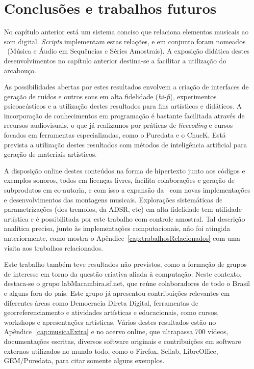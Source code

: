 \chapter{Conclusões e trabalhos futuros} %
\label{cap:conclusao}

No capítulo anterior está um sistema conciso
que relaciona elementos musicais ao som digital. \emph{Scripts} 
implementam estas relações, e em conjunto foram nomeados \massa\ (Música
e Áudio em Sequências e Séries Amostrais). 
A exposição didática destes desenvolvimentos no
capítulo anterior destina-se a facilitar a utilização
do arcabouço.

As possibilidades abertas por estes resultados envolvem a criação de interfaces de geração de ruídos e outros sons em alta fidelidade (\emph{hi-fi}), experimentos psicoacústicos e a utilização destes resultados para fins artísticos e didáticos. A incorporação de conhecimentos
em programação é bastante facilitada através de recursos audiovisuais, o que já realizamos por práticas de \emph{livecoding} e cursos focados em ferramentas especializadas, como o Puredata e o ChucK.
Está prevista a utilização destes resultados com
métodos de inteligência artificial para geração de materiais artísticos.

A disposição online destes conteúdos na forma de hipertexto junto aos códigos e exemplos sonoros, todos em licenças livres, facilita colaborações e geração de subprodutos em co-autoria, e com isso a expansão da \massa\ com novas implementações e desenvolvimentos das montagens musicais.
Explorações sistemáticas de parametrizações (dos tremolos, da ADSR, etc) em alta fidelidade tem utilidade artística e é possibilitada por este trabalho com controle amostral. Tal descrição analítica precisa, junto às implementações computacionais, não foi atingida anteriormente, como mostra o Apêndice~\ref{cap:trabalhosRelacionados} com uma visita aos trabalhos relacionados.

Este trabalho também teve resultados não previstos, como a formação de grupos
de interesse em torno da questão criativa aliada à computação.
Neste contexto, destaca-se o grupo
labMacambira.sf.net, que reúne colaboradores de todo o Brasil e alguns fora do país.
Este grupo
já apresentou contribuições relevantes em diferentes áreas
como Democracia Direta Digital, ferramentas de georreferenciamento e
atividades artísticas e educacionais, como cursos, workshops e apresentações artísticas. Vários destes resultados estão no Apêndice~\ref{cap:musicaExtra} e no acervo online, que ultrapassa 700 vídeos, documentações escritas, diversos software originais e contribuições em software externos utilizados no mundo todo, como o Firefox, Scilab, LibreOffice, GEM/Puredata, para citar somente alguns exemplos.\cite{siteLM,wikiLM,vimeoLM}

